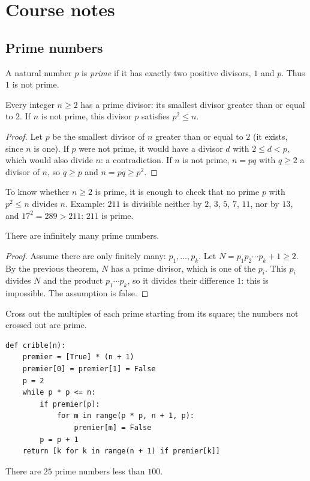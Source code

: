 \mxnewpage
\section{Course notes}
\subsection{Prime numbers}
\begin{definition}
A natural number $p$ is \emph{prime} if it has exactly two positive divisors, $1$ and $p$. Thus $1$ is not prime.
\end{definition}
\begin{theorem}
Every integer $n\ge2$ has a prime divisor: its smallest divisor greater than or equal to $2$. If $n$ is not prime, this divisor $p$ satisfies $p^2\le n$.
\end{theorem}
\begin{proof}
Let $p$ be the smallest divisor of $n$ greater than or equal to $2$ (it exists, since $n$ is one). If $p$ were not prime, it would have a divisor $d$ with $2\le d<p$, which would also divide $n$: a contradiction. If $n$ is not prime, $n=pq$ with $q\ge2$ a divisor of $n$, so $q\ge p$ and $n=pq\ge p^2$.
\end{proof}
\begin{method}
To know whether $n\ge2$ is prime, it is enough to check that no prime $p$ with $p^2\le n$ divides $n$. Example: $211$ is divisible neither by $2$, $3$, $5$, $7$, $11$, nor by $13$, and $17^2=289>211$: $211$ is prime.
\end{method}
\begin{theorem}
There are infinitely many prime numbers.
\end{theorem}
\begin{proof}
Assume there are only finitely many: $p_1,\dots,p_k$. Let $N=p_1p_2\cdots p_k+1\ge2$. By the previous theorem, $N$ has a prime divisor, which is one of the $p_i$. This $p_i$ divides $N$ and the product $p_1\cdots p_k$, so it divides their difference $1$: this is impossible. The assumption is false.
\end{proof}
\begin{keypoint}
Cross out the multiples of each prime starting from its square; the numbers not crossed out are prime.
\begin{lstlisting}
def crible(n):
    premier = [True] * (n + 1)
    premier[0] = premier[1] = False
    p = 2
    while p * p <= n:
        if premier[p]:
            for m in range(p * p, n + 1, p):
                premier[m] = False
        p = p + 1
    return [k for k in range(n + 1) if premier[k]]
\end{lstlisting}
There are $25$ prime numbers less than $100$.
\end{keypoint}
